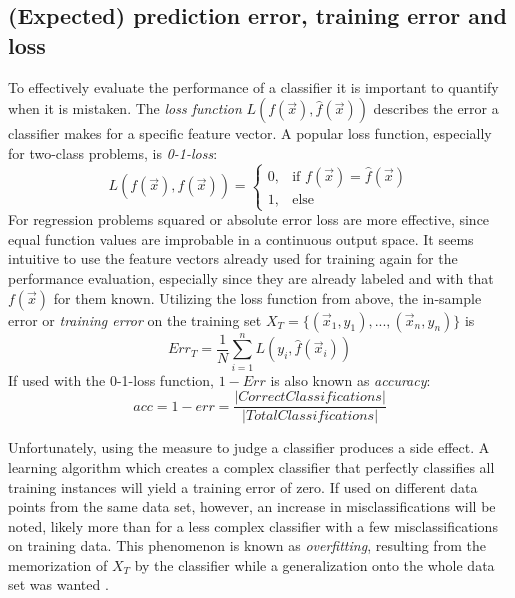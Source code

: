 \subsection{(Expected) prediction error, training error and loss}
To effectively evaluate the performance of a classifier it is important to quantify when it is mistaken. The \textit{loss function} $L(f(\vec{x}), \hat{f}(\vec{x}))$ describes the error a classifier makes for a specific feature vector. A popular loss function, especially for two-class problems, is \textit{0-1-loss}:
\begin{equation}
L(f(\vec{x}), \hat{f}(\vec{x})) =
\begin{cases}
	0, & \text{if }f(\vec{x}) = \hat{f}(\vec{x}) \\
	1, & \text{else}
\end{cases}
\end{equation}
For regression problems squared or absolute error loss are more effective, since equal function values are improbable in a continuous output space. It seems intuitive to use the feature vectors already used for training again for the performance evaluation, especially since they are already labeled and with that $f(\vec{x})$ for them known. Utilizing the loss function from above, the in-sample error or \textit{training error} \cite{HastieEtAl2009} on the training set $X_T = \{(\vec{x}_1, y_1), ..., (\vec{x}_n, y_n)\}$ is
\begin{equation}
Err_{T} = \frac{1}{N}\sum_{i=1}^{n} L(y_i, \hat{f}(\vec{x}_i))
\end{equation}
If used with the 0-1-loss function, $1 - Err$ is also known as \textit{accuracy}:
\begin{equation}
acc = 1 - err = \frac{|Correct Classifications|}{|Total Classifications|}
\end{equation}

Unfortunately, using the measure to judge a classifier produces a side effect. A learning algorithm which creates a complex classifier that perfectly classifies all training instances will yield a training error of zero. If used on different data points from the same data set, however, an increase in misclassifications will be noted, likely more than for a less complex classifier with a few misclassifications on training data. This phenomenon is known as \textit{overfitting}, resulting from the memorization of $X_T$ by the classifier while a generalization onto the whole data set was wanted \cite{Dietterich1995}.


